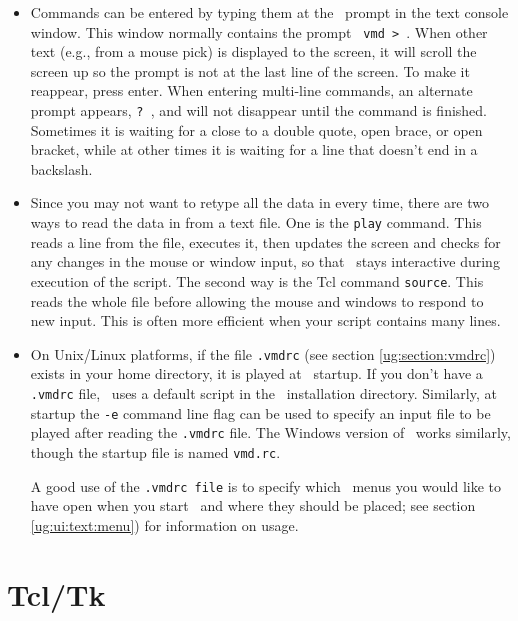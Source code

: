 \begin{itemize}
\item 
Commands can be entered by typing them at the \VMD\ prompt in 
the text console window.  This window normally contains the prompt {\tt
vmd > }.  When other text (e.g., from a mouse pick) is displayed to
the screen, it will scroll the screen up so the prompt is not at the
last line of the screen.  To make it reappear, press enter.  When
entering multi-line commands, an alternate prompt appears, {\tt ? },
and will not disappear until the command is finished.  Sometimes it is
waiting for a close to a double quote, open brace, or open bracket,
while at other times it is waiting for a line that doesn't end in a
backslash.  

\item
{}
Since you may not want to retype all the data in every time, there are
two ways to read the data in from a text file.  One 
is the 
{\tt play} command.  This reads a line from the file,
executes it, then updates the screen and checks for any changes in the
mouse or window input, so that \VMD\ stays interactive during execution of
the script.  The second way is the Tcl command 
{\tt source}.  This reads the whole file before allowing the
mouse and windows to respond to new input.  This is often more efficient
when your script contains many lines.  

\item
{}
On Unix/Linux platforms, if the file {\tt .vmdrc} (see
section \ref{ug:section:vmdrc}) exists in your home
directory, it is played at \VMD\ startup.  If you don't have a {\tt .vmdrc}
file, \VMD\ uses a default script in the \VMD\ installation directory.  
Similarly, at startup the {\tt -e} command line flag can be used to specify 
an input file to be played after reading the {\tt .vmdrc} file.  
The Windows version of \VMD\ works similarly, though the startup file
is named {\tt vmd.rc}.

A good use of the {\tt .vmdrc file} is to specify which \VMD\ menus you
would like to have open when you start \VMD\ and where they should be placed;
see section \ref{ug:ui:text:menu}) for information
on usage.
\end{itemize}

\section{Tcl/Tk}
\label{ug:section:tcl}

